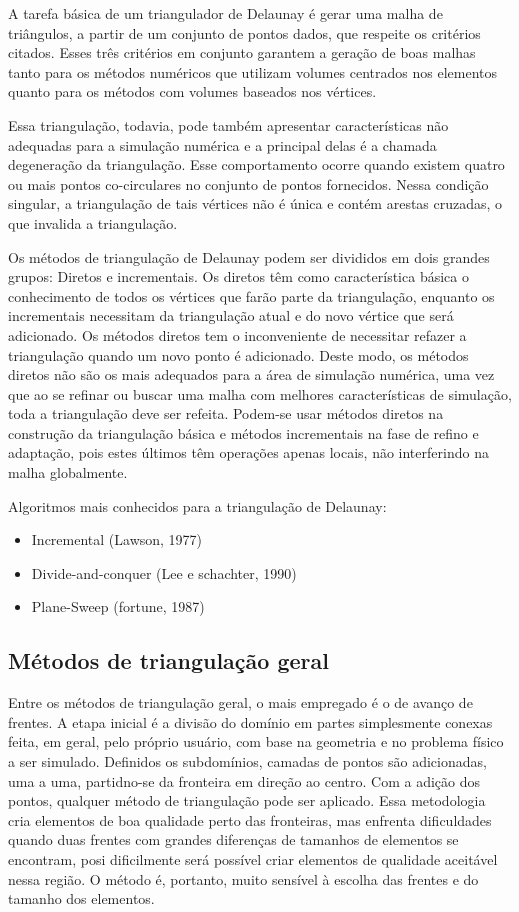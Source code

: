 A tarefa básica de um triangulador de Delaunay é gerar uma malha de triângulos, a partir de um conjunto de pontos dados, que respeite os critérios citados. Esses três critérios em conjunto garantem a geração de boas malhas tanto para os métodos numéricos que utilizam volumes centrados nos elementos quanto para os métodos com volumes baseados nos vértices.

Essa triangulação, todavia, pode também apresentar características não adequadas para a simulação numérica e a principal delas é a chamada degeneração da triangulação. Esse comportamento ocorre quando existem quatro ou mais pontos co-circulares no conjunto de pontos fornecidos. Nessa condição singular, a triangulação de tais vértices não é única e contém arestas cruzadas, o que invalida a triangulação.

Os métodos de triangulação de Delaunay podem ser divididos em dois grandes grupos: Diretos e incrementais. Os diretos têm como característica básica o conhecimento de todos os vértices que farão parte da triangulação, enquanto os incrementais necessitam da triangulação atual e do novo vértice que será adicionado. Os métodos diretos tem o inconveniente de necessitar refazer a triangulação quando um novo ponto é adicionado. Deste modo, os métodos diretos não são os mais adequados para a área de simulação numérica, uma vez que ao se refinar ou buscar uma malha com melhores características de simulação, toda a triangulação deve ser refeita. Podem-se usar métodos diretos na construção da triangulação básica e métodos incrementais na fase de refino e adaptação, pois estes últimos têm operações apenas locais, não interferindo na malha globalmente.

Algoritmos mais conhecidos para a triangulação de Delaunay:
\begin{itemize}
    \item Incremental (Lawson, 1977)
    \item Divide-and-conquer (Lee e schachter, 1990)
    \item Plane-Sweep (fortune, 1987)
\end{itemize}

\subsection{Métodos de triangulação geral}

Entre os métodos de triangulação geral, o mais empregado é o de avanço de frentes. A etapa inicial é a divisão do domínio em partes simplesmente conexas feita, em geral, pelo próprio usuário, com base na geometria e no problema físico a ser simulado. Definidos os subdomínios, camadas de pontos são adicionadas, uma a uma, partidno-se da fronteira em direção ao centro. Com a adição dos pontos, qualquer método de triangulação pode ser aplicado. Essa metodologia cria elementos de boa qualidade perto das fronteiras, mas enfrenta dificuldades quando duas frentes com grandes diferenças de tamanhos de elementos se encontram, posi dificilmente será possível criar elementos de qualidade aceitável nessa região. O método é, portanto, muito sensível à escolha das frentes e do tamanho dos elementos.


